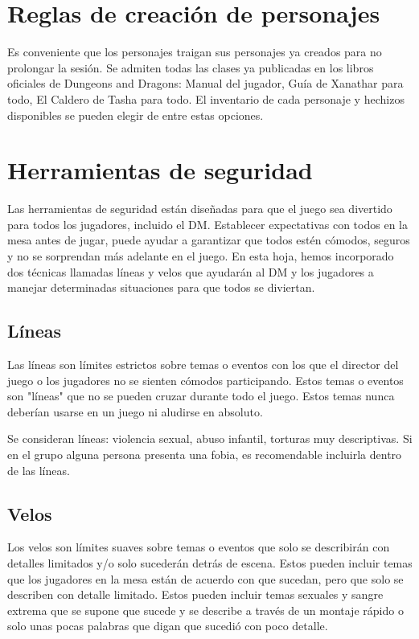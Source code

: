 \documentclass[10pt,twoside,twocolumn,openany]{dndbook}
\begin{document}
\section*{Reglas de creación de personajes}

Es conveniente que los personajes traigan sus personajes ya creados para no prolongar la sesión. 
Se admiten todas las clases ya publicadas en los libros oficiales de Dungeons and Dragons: Manual 
del jugador, Guía de Xanathar para todo, El Caldero de Tasha para todo. El inventario de cada 
personaje y hechizos disponibles se pueden elegir de entre estas opciones.

\section*{Herramientas de seguridad}

Las herramientas de seguridad están diseñadas para que el juego sea divertido para todos los 
jugadores, incluido el DM. Establecer expectativas con todos en la mesa antes de jugar, puede 
ayudar a garantizar que todos estén cómodos, seguros y no se sorprendan más adelante en el juego. 
En esta hoja, hemos incorporado dos técnicas llamadas líneas y velos que ayudarán al DM y los 
jugadores a manejar determinadas situaciones para que todos se diviertan.

\subsection*{Líneas}

Las líneas son límites estrictos sobre temas o eventos con los que el director del juego o los 
jugadores no se sienten cómodos participando. Estos temas o eventos son "líneas" que no se pueden 
cruzar durante todo el juego. Estos temas nunca deberían usarse en un juego ni aludirse en absoluto.

Se consideran líneas: violencia sexual, abuso infantil, torturas muy descriptivas. Si en el grupo 
alguna persona presenta una fobia, es recomendable incluirla dentro de las líneas.

\subsection*{Velos}

Los velos son límites suaves sobre temas o eventos que solo se describirán con detalles limitados 
y/o solo sucederán detrás de escena. Estos pueden incluir temas que los jugadores en la mesa están 
de acuerdo con que sucedan, pero que solo se describen con detalle limitado. Estos pueden incluir 
temas sexuales y sangre extrema que se supone que sucede y se describe a través de un montaje 
rápido o solo unas pocas palabras que digan que sucedió con poco detalle.
\end{document}
